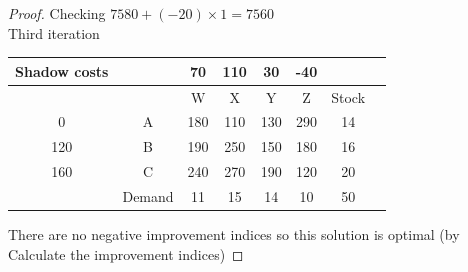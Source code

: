 \documentclass[a4paper]{article}
\begin{document}
\begin{eg}
\begin{proof}
		Checking $7580+(-20)\times 1=7560$\\

		Third iteration
		\begin{center}
			\begin{tabular}{|c|c|c|c|c|c|c|c|}
				\hline
				Shadow costs &        & 70  & 110 & 30  & -40 &       \\
				\hline
				             &        & W   & X   & Y   & Z   & Stock \\
				\hline
				0            & A      & 180 & 110 & 130 & 290 & 14    \\
				\hline
				120          & B      & 190 & 250 & 150 & 180 & 16    \\
				\hline
				160          & C      & 240 & 270 & 190 & 120 & 20    \\
				\hline
				             & Demand & 11  & 15  & 14  & 10  & 50    \\
				\hline
			\end{tabular}
		\end{center}
		There are no negative improvement indices so this solution is optimal (by Calculate the improvement indices)
	\end{proof}

\end{eg}
\end{document}
